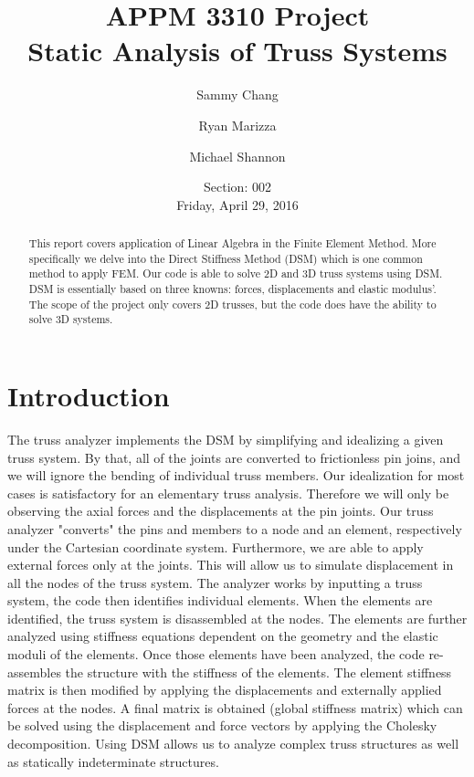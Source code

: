 \documentclass{article}
\title{APPM 3310 Project\\\Large{Static Analysis of Truss Systems}}
\author{Sammy Chang\and{}Ryan Marizza\and{}Michael Shannon}
\date{Section: 002\\\vspace{1em}Friday, April 29, 2016}
\begin{document}
\pagestyle{fancy}

\maketitle


\begin{abstract}
This report covers application of Linear Algebra in the Finite Element Method.
More specifically we delve into the Direct Stiffness Method (DSM) which is one
common method to apply FEM. Our code is able to solve 2D and 3D truss systems
using DSM. DSM is essentially based on three knowns: forces, displacements and
elastic modulus'. The scope of the project only covers 2D trusses, but the
code does have the ability to solve 3D systems.
\end{abstract}

\setcounter{tocdepth}{1}
\tableofcontents




\newpage
\section{Introduction}
The truss analyzer implements the DSM by simplifying and idealizing a given
truss system. By that, all of the joints are converted to frictionless pin
joins, and we will ignore the bending of individual truss members. Our
idealization for most cases is satisfactory for an elementary truss analysis.
Therefore we will only be observing the axial forces and the displacements at
the pin joints. Our truss analyzer "converts" the pins and members to a node
and an element, respectively under the Cartesian coordinate system.
Furthermore, we are able to apply external forces only at the joints. This
will allow us to simulate displacement in all the nodes of the truss system.
The analyzer works by inputting a truss system, the code then identifies
individual elements. When the elements are identified, the truss system is
disassembled at the nodes. The elements are further analyzed using stiffness
equations dependent on the geometry and the elastic moduli of the elements.
Once those elements have been analyzed, the code re-assembles the structure
with the stiffness of the elements. The element stiffness matrix is then
modified by applying the displacements and externally applied forces at the
nodes. A final matrix is obtained (global stiffness matrix) which can be
solved using the displacement and force vectors by applying the Cholesky
decomposition. Using DSM allows us to analyze complex truss structures as well
as statically indeterminate structures.
\end{document}
